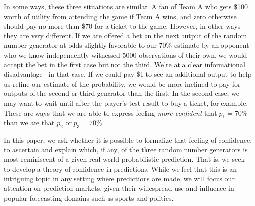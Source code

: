 \documentclass[sigconf,anonymous]{aamas}   %
\begin{document}
In some ways, these three situations are similar. 
A fan of Team A who
gets \$100 worth of
utility from attending the game if Team A wins, and zero 
otherwise %
should pay no more than \$70 for a ticket to the game. 
However, in other ways they are very different. 
If we are offered a bet on the next output of the random number generator at odds slightly favorable to our 70\% estimate by an opponent who we know independently witnessed %
5000 observations of their own, we would accept the bet in the first case but not the third.
We're at a clear informational disadvantage~\cite{MilgromStokey} in that case.
If we could pay \$1 to see an additional output to help us refine our estimate of the probability, we would be more inclined to pay for outputs of the second or third generator than the first. 
In the second case, %
we may want to wait until after the player's test result to buy a ticket, for example. 
These are ways that we are able to express feeling \emph{more confident} that $p_1=70\%$ than we are that $p_2$ or $p_3=70\%$.

In this paper, we ask whether it is possible to formalize that feeling of confidence: to ascertain and explain which, if any, of the three random number generators is most reminiscent of a given real-world probabilistic prediction.
That is, we seek to develop a theory of confidence in predictions. 
While we feel that this is an intriguing topic in any setting where predictions are made, 
we will focus our attention on prediction markets, given their widespread use and influence in popular forecasting domains such as sports and politics.
\end{document}
